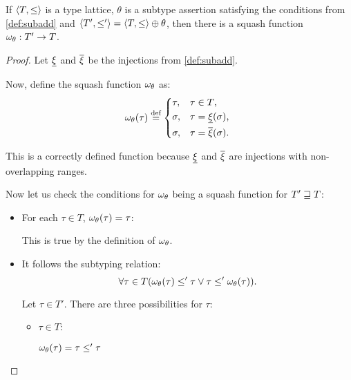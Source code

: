 \documentclass[main.tex]{subfiles}
\begin{document}
\begin{lemma}
    \label{lemma:subadd:squash}
    If $\langle  T,  \leq  \rangle$ is a type lattice, $\theta$
    is a subtype assertion satisfying the conditions from \cref{def:subadd}
    and $\langle  T',  \leq'  \rangle = \langle  T,  \leq  \rangle \oplus \theta$, then
    there is a squash function $\omega_{\theta} : T' \rightarrow T$.
\end{lemma}
\begin{proof}
    Let $\underline{\xi}$ and $\overline{\xi}$ be the injections from \cref{def:subadd}.

    Now, define the squash function $\omega_{\theta}$ as:
    \[
        \squash_{\theta}(\tau) \defeq
        \begin{cases*}
            \tau ,& $\tau \in T$, \\
            \sigma ,& $\tau = \subtyper{\xi}(\sigma)$, \\
            \sigma ,& $\tau = \suptyper{\xi}(\sigma)$. \\
        \end{cases*}
    \]

    This is a correctly defined function because $\underline{\xi}$ and
    $\overline{\xi}$ are injections with non-overlapping ranges.

    Now let us check the conditions for $\omega_{\theta}$
    being a squash function for $T' \sqsupseteq T$:

    \begin{itemize}
        \item For each $\tau \in T$, $\omega_{\theta}(\tau) = \tau$:

            This is true by the definition of $\omega_{\theta}$.

        \item It follows the subtyping relation:
            \[ \forall \tau \in T
                (\omega_{\theta}(\tau) \leq' \tau \lor \tau \leq' \omega_{\theta}(\tau)). \]

            Let $\tau \in T'$. There are three possibilities for $\tau$:
            \begin{itemize}
                \item $\tau \in T$:

                    $\omega_{\theta}(\tau) = \tau \leq' \tau$


\end{itemize}
\end{itemize}
\end{proof}
\end{document}
